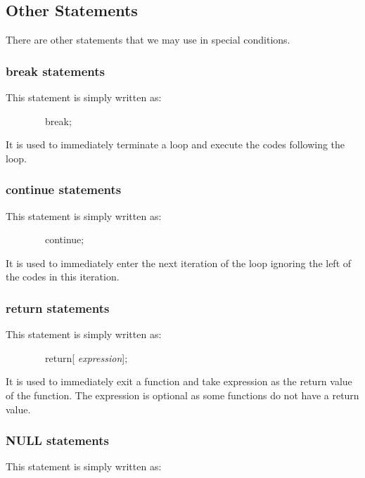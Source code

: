 \documentclass[12pt,psfig,a4]{article}
\begin{document}
\subsection{Other Statements}
There are other statements that we may use in special conditions.

\subsubsection{break statements}
This statement is simply written as:

\begin{code}
\begin{tabbing}
~~~~~~~~break;
\end{tabbing}
\end{code}

It is used to immediately terminate a loop and execute the codes following the loop.

\subsubsection{continue statements}
This statement is simply written as:

\begin{code}
\begin{tabbing}
~~~~~~~~continue;
\end{tabbing}
\end{code}

It is used to immediately enter the next iteration of the loop ignoring the left of the codes in this iteration.

\subsubsection{return statements}
This statement is simply written as:

\begin{code}
\begin{tabbing}
~~~~~~~~return[ \textsl{expression}];
\end{tabbing}
\end{code}

It is used to immediately exit a function and take expression as the return value of the function. The expression is optional as some functions do not have a return value.

\subsubsection{NULL statements}
This statement is simply written as:
\end{document}

